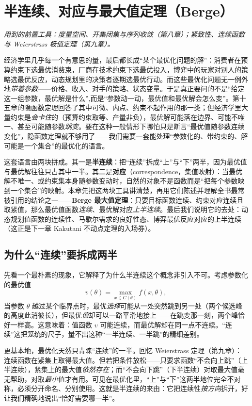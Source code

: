 \chapter{半连续、对应与最大值定理（Berge）}
\label{ch:berge}

\noindent\emph{用到的前置工具：度量空间、开集闭集与序列收敛（第八章）；紧致性、连续函数与 Weierstrass 极值定理（第九章）。}
\medskip

经济学里几乎每一个有意思的量，最后都长成``某个最优化问题的解''：消费者在预算约束下选最优消费束，厂商在技术约束下选最优投入，博弈中的玩家对别人的策略选最优反应，动态规划里的决策者逐期选最优行动。而这些最优化问题无一例外地\emph{带着参数}——价格、收入、对手的策略、状态变量。于是真正要问的不是``给定这一组参数，最优解是什么'',而是``参数动一动，最优值和最优解会怎么变''。第十五章的隐函数定理回答了其中可微、内点、约束不起作用的那一类；但经济学里大量约束是\emph{会卡住}的（预算约束取等、产量非负），最优解可能落在边界、可能不唯一、甚至可能随参数\emph{跳变}。要在这种一般情形下哪怕只是断言``最优值随参数连续变化''，隐函数定理就不够用了——我们需要一套能处理``参数化的、带约束的、解可能是一个集合''的最优化的语言。

这套语言由两块拼成。其一是\textbf{半连续}：把``连续''拆成``上''与``下''两半，因为最优值与最优解往往只占其中一半。其二是\textbf{对应}（correspondence，集值映射）：当最优解不唯一、或约束集本身随参数变动时，自然的对象不是函数而是``把每个参数映到一个集合''的映射。本章先把这两块工具讲清楚，再用它们陈述并理解全书最常被引用的结论之一——\textbf{Berge 最大值定理}：只要目标函数连续、约束对应连续且取紧值，那么最优值函数\emph{连续}、最优解对应\emph{上半连续}。最后我们说明它的去处：动态规划值函数的连续性、马歇尔需求的良好性态、博弈最优反应对应的上半连续（这正是下一章 Kakutani 不动点定理的入场券）。

\section{为什么``连续''要拆成两半}
\label{sec:berge-motivation}

先看一个最朴素的现象，它解释了为什么半连续这个概念非引入不可。考虑参数化的最优值
\[
    v(\theta)=\max_{x\in C(\theta)}f(x,\theta),
\]
当参数 $\theta$ 越过某个临界点时，最优\emph{选择}可能从一处突然跳到另一处（两个候选峰的高度此消彼长），但最优\emph{值}却可以一路平滑地接上——在跳变那一刻，两个峰恰好一样高。这意味着：值函数 $v$ 可能连续，而最优解却在同一点不连续。``连续''这把笼统的尺子，量不出这种``一半连续、一半跳''的精细差别。

更基本地，最优化天然只青睐``连续''的一半。回忆 Weierstrass 定理（第九章）：连续函数在紧集上取得最大值。但若把条件放松——只要求函数``不会向上跳''（上半连续），紧集上的最大值\emph{依然存在}；而``不会向下跳''（下半连续）对取最大值毫无帮助，对取\emph{最小}值才有用。可见在最优化里，``上''与``下''这两半地位完全不对称，必须分开命名、分别使用。这就是半连续的来由：它把连续性\emph{按方向}拆开，好让我们精确地说出``恰好需要哪一半''。

